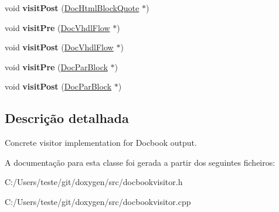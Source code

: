 \begin{DoxyCompactItemize}
\item 
\hypertarget{class_docbook_doc_visitor_a52c088bd7da086101ebe146d4fa12d03}{void {\bfseries visit\-Post} (\hyperlink{class_doc_html_block_quote}{Doc\-Html\-Block\-Quote} $\ast$)}\label{class_docbook_doc_visitor_a52c088bd7da086101ebe146d4fa12d03}

\item 
\hypertarget{class_docbook_doc_visitor_ab7c53055027c60e0a3a9f4f93e9c3d85}{void {\bfseries visit\-Pre} (\hyperlink{class_doc_vhdl_flow}{Doc\-Vhdl\-Flow} $\ast$)}\label{class_docbook_doc_visitor_ab7c53055027c60e0a3a9f4f93e9c3d85}

\item 
\hypertarget{class_docbook_doc_visitor_a79febe42f6e032c27aad9a418f979eca}{void {\bfseries visit\-Post} (\hyperlink{class_doc_vhdl_flow}{Doc\-Vhdl\-Flow} $\ast$)}\label{class_docbook_doc_visitor_a79febe42f6e032c27aad9a418f979eca}

\item 
\hypertarget{class_docbook_doc_visitor_acc4035c695184dd01a26145a88c1a588}{void {\bfseries visit\-Pre} (\hyperlink{class_doc_par_block}{Doc\-Par\-Block} $\ast$)}\label{class_docbook_doc_visitor_acc4035c695184dd01a26145a88c1a588}

\item 
\hypertarget{class_docbook_doc_visitor_a4bd3a84f45e2f6dc6420638ee8e4ee27}{void {\bfseries visit\-Post} (\hyperlink{class_doc_par_block}{Doc\-Par\-Block} $\ast$)}\label{class_docbook_doc_visitor_a4bd3a84f45e2f6dc6420638ee8e4ee27}

\end{DoxyCompactItemize}


\subsection{Descrição detalhada}
Concrete visitor implementation for Docbook output. 

A documentação para esta classe foi gerada a partir dos seguintes ficheiros\-:\begin{DoxyCompactItemize}
\item 
C\-:/\-Users/teste/git/doxygen/src/docbookvisitor.\-h\item 
C\-:/\-Users/teste/git/doxygen/src/docbookvisitor.\-cpp\end{DoxyCompactItemize}

